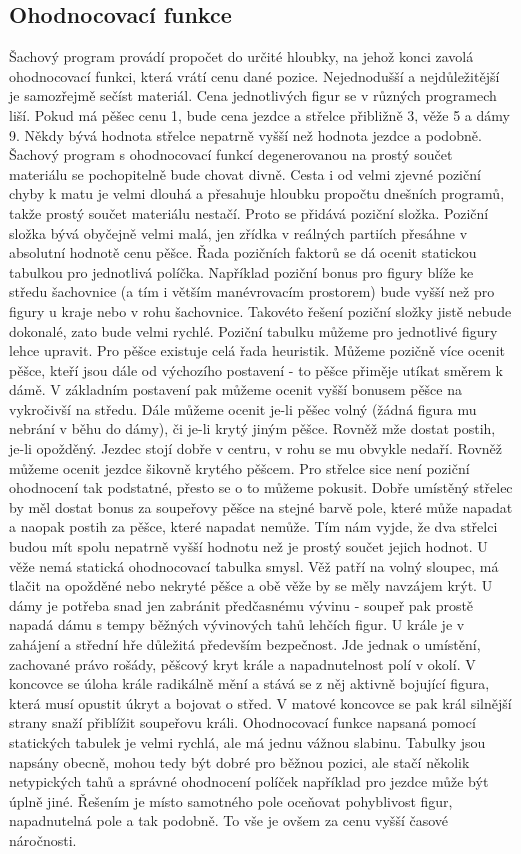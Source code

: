 \documentclass[11pt, titlepage]{article}
\begin{document}
\subsection{Ohodnocovací funkce}

Šachový program provádí propočet do určité hloubky, na jehož konci zavolá ohodnocovací funkci, která vrátí cenu dané pozice. Nejednodušší a nejdůležitější je samozřejmě sečíst materiál. Cena jednotlivých figur se v různých programech liší. Pokud má pěšec cenu 1, bude cena jezdce a střelce přibližně 3, věže 5 a dámy 9. Někdy bývá hodnota střelce nepatrně vyšší než hodnota jezdce a podobně. Šachový program s ohodnocovací funkcí degenerovanou na prostý součet materiálu se pochopitelně bude chovat divně. Cesta i od velmi zjevné poziční chyby k matu je velmi dlouhá a přesahuje hloubku propočtu dnešních programů, takže prostý součet materiálu nestačí. Proto se přidává poziční složka.
Poziční složka bývá obyčejně velmi malá, jen zřídka v reálných partiích přesáhne v absolutní hodnotě cenu pěšce. Řada pozičních faktorů se dá ocenit statickou tabulkou pro jednotlivá políčka. Například poziční bonus pro figury blíže ke středu šachovnice (a tím i větším manévrovacím prostorem) bude vyšší než pro figury u kraje nebo v rohu šachovnice. Takovéto řešení poziční složky jistě nebude dokonalé, zato bude velmi rychlé. Poziční tabulku můžeme pro jednotlivé figury lehce upravit.
Pro pěšce existuje celá řada heuristik. Můžeme pozičně více ocenit pěšce, kteří jsou dále od výchozího postavení - to pěšce přiměje utíkat směrem k dámě. V základním postavení pak můžeme ocenit vyšší bonusem pěšce na vykročivší na středu. Dále můžeme ocenit je-li pěšec volný (žádná figura mu nebrání v běhu do dámy), či je-li krytý jiným pěšce. Rovněž mže dostat postih, je-li opožděný.
Jezdec stojí dobře v centru, v rohu se mu obvykle nedaří. Rovněž můžeme ocenit jezdce šikovně krytého pěšcem.
Pro střelce sice není poziční ohodnocení tak podstatné, přesto se o to můžeme pokusit. Dobře umístěný střelec by měl dostat bonus za soupeřovy pěšce na stejné barvě pole, které může napadat a naopak postih za pěšce, které napadat nemůže. Tím nám vyjde, že dva střelci budou mít spolu nepatrně vyšší hodnotu než je prostý součet jejich hodnot.
U věže nemá statická ohodnocovací tabulka smysl. Věž patří na volný sloupec, má tlačit na opožděné nebo nekryté pěšce a obě věže by se měly navzájem krýt.
U dámy je potřeba snad jen zabránit předčasnému vývinu - soupeř pak prostě napadá dámu s tempy běžných vývinových tahů lehčích figur.
U krále je v zahájení a střední hře důležitá především bezpečnost. Jde jednak o umístění, zachované právo rošády, pěšcový kryt krále a napadnutelnost polí v okolí. V koncovce se úloha krále radikálně mění a stává se z něj aktivně bojující figura, která musí opustit úkryt a bojovat o střed. V matové koncovce se pak král silnější strany snaží přiblížit soupeřovu  králi.
Ohodnocovací funkce napsaná pomocí statických tabulek je velmi rychlá, ale má jednu vážnou slabinu. Tabulky jsou napsány obecně, mohou tedy být dobré pro běžnou pozici, ale stačí několik netypických tahů a správné ohodnocení políček například pro jezdce může být úplně jiné. Řešením je místo samotného pole oceňovat pohyblivost figur, napadnutelná pole a tak podobně. To vše je ovšem za cenu vyšší časové náročnosti.
\end{document}
